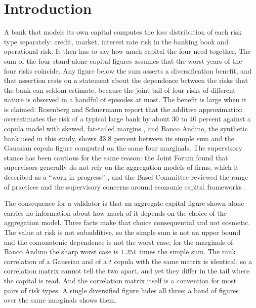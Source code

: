 \section{Introduction}
\label{sec:introduction}

A bank that models its own capital computes the loss distribution of each risk type separately: credit, market, interest rate risk in
the banking book and operational risk. It then has to say how much capital the four need together. The sum of the four stand-alone
capital figures assumes that the worst years of the four risks coincide. Any figure below the sum asserts a diversification benefit,
and that assertion rests on a statement about the dependence between the risks that the bank can seldom estimate, because the
joint tail of four risks of different nature is observed in a handful of episodes at most. The benefit is large when it is claimed:
Rosenberg and Schuermann report that the additive approximation overestimates the risk of a typical large bank by about 30 to 40
percent against a copula model with skewed, fat-tailed margins \citep{rosenberg2006}, and Banco Andino, the synthetic bank used in
this study, shows $33.8$ percent between its simple sum and the Gaussian copula figure computed on the same four
marginals. The supervisory stance has been cautious for the same reason: the Joint Forum found that supervisors generally do not
rely on the aggregation models of firms, which it described as a ``work in progress'' \citep{jointforum2010}, and the Basel
Committee reviewed the range of practices and the supervisory concerns around economic capital frameworks \citep{bcbs2009}.

The consequence for a validator is that an aggregate capital figure shown alone carries no information about how much of it depends
on the choice of the aggregation model. Three facts make that choice consequential and not cosmetic. The value at risk is not
subadditive, so the simple sum is not an upper bound and the comonotonic dependence is not the worst case; for the marginals of
Banco Andino the sharp worst case is $1.251$ times the simple sum. The rank correlation of a Gaussian and of a
$t$ copula with the same matrix is identical, so a correlation matrix cannot tell the two apart, and yet they differ in the
tail where the capital is read. And the correlation matrix itself is a convention for most pairs of risk types. A single diversified
figure hides all three; a band of figures over the same marginals shows them.

